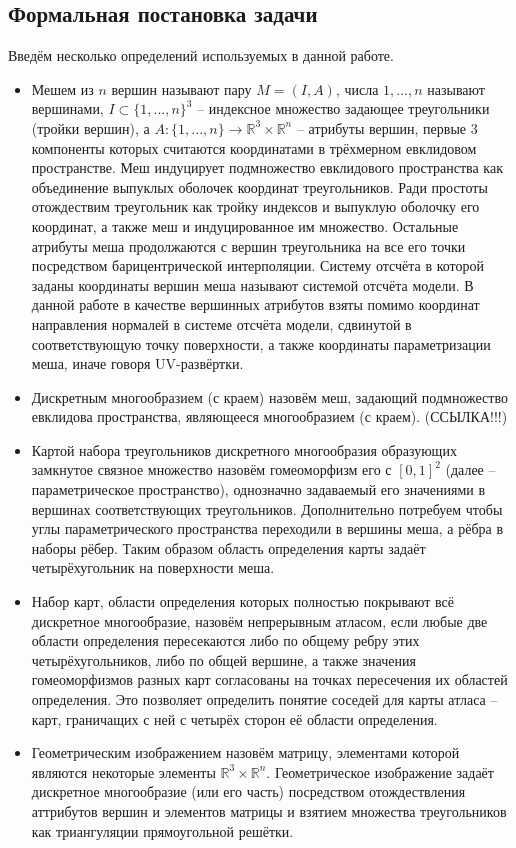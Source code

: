 \documentclass[12pt]{extarticle}
\begin{document}
\subsection{Формальная постановка задачи}
Введём несколько определений используемых в данной работе.
\begin{itemize}
\item Мешем из $n$ вершин называют пару $M = (I, A)$, числа $1,...,n$ называют вершинами, $I \subset \{1, ..., n\}^3$ -- индексное множество задающее треугольники (тройки вершин), а $A: \{1, ..., n\} \rightarrow \mathbb{R}^3 \times \mathbb{R}^n$ -- атрибуты вершин, первые 3 компоненты которых считаются координатами в трёхмерном евклидовом пространстве. Меш индуцирует подмножество евклидового пространства как объединение выпуклых оболочек координат треугольников. Ради простоты отождествим треугольник как тройку индексов и выпуклую оболочку его координат, а также меш и индуцированное им множество. Остальные атрибуты меша продолжаются с вершин треугольника на все его точки посредством барицентрической интерполяции. Систему отсчёта в которой заданы координаты вершин меша называют системой отсчёта модели. В данной работе в качестве вершинных атрибутов взяты помимо координат направления нормалей в системе отсчёта модели, сдвинутой в соответствующую точку поверхности, а также координаты параметризации меша, иначе говоря UV-развёртки.
\item Дискретным многообразием (с краем) назовём меш, задающий подмножество евклидова пространства, являющееся многообразием (с краем). (ССЫЛКА!!!)
\item Картой набора треугольников дискретного многообразия образующих замкнутое связное множество назовём гомеоморфизм его с $[0,1]^2$ (далее -- параметрическое пространство), однозначно задаваемый его значениями в вершинах соответствующих треугольников. Дополнительно потребуем чтобы углы параметрического пространства переходили в вершины меша, а рёбра в наборы рёбер. Таким образом область определения карты задаёт четырёхугольник на поверхности меша.
\item Набор карт, области определения которых полностью покрывают всё дискретное многообразие, назовём непрерывным атласом, если любые две области определения пересекаются либо по общему ребру этих четырёхугольников, либо по общей вершине, а также значения гомеоморфизмов разных карт согласованы на точках пересечения их областей определения. Это позволяет определить понятие соседей для карты атласа -- карт, граничащих с ней с четырёх сторон её области определения.
\item Геометрическим изображением назовём матрицу, элементами которой являются некоторые элементы $\mathbb{R}^3\times \mathbb{R}^n$. Геометрическое изображение задаёт дискретное многообразие (или его часть) посредством отождествления аттрибутов вершин и элементов матрицы и взятием множества треугольников как триангуляции прямоугольной решётки.

\end{itemize}
\end{document}
